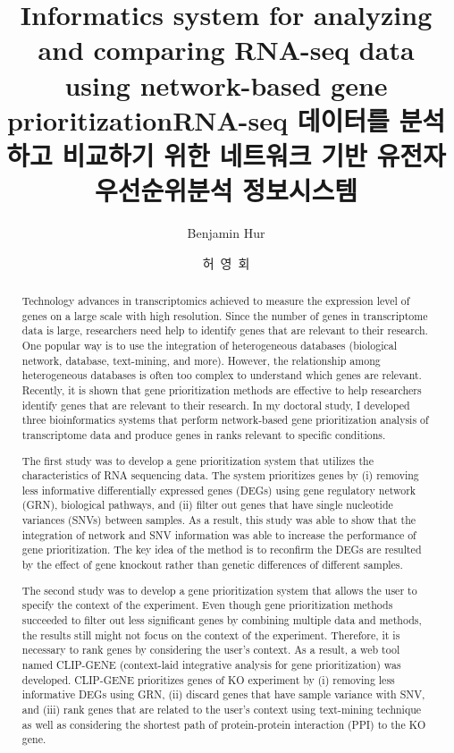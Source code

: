 \documentclass[oneside,phd]{snuthesis}
\title{Informatics system for analyzing and comparing RNA-seq data using network-based gene prioritization}
\title*{RNA-seq 데이터를 분석하고 비교하기 위한 네트워크 기반 유전자우선순위분석 정보시스템}
\author{Benjamin Hur}
\author*{허~영~회} %
\begin{document}
\makefrontcover
\makefrontcover
\makeapproval

\cleardoublepage
{}

\begin{abstract}
\noindent
Technology advances in transcriptomics achieved to measure the expression level of genes on a large scale with high resolution. Since the number of genes in transcriptome data is large, researchers need help to identify genes that are relevant to their research. One popular way is to use the integration of heterogeneous databases (biological network, database, text-mining, and more). However, the relationship among heterogeneous databases is often too complex to understand which genes are relevant. Recently, it is shown that gene prioritization methods are effective to help researchers identify genes that are relevant to their research. In my doctoral study, I developed three bioinformatics systems that perform network-based gene prioritization analysis of transcriptome data and produce genes in ranks relevant to specific conditions.

The first study was to develop a gene prioritization system that utilizes the characteristics of RNA sequencing data. The system prioritizes genes by (i) removing less informative differentially expressed genes (DEGs) using gene regulatory network (GRN), biological pathways, and (ii) filter out genes that have single nucleotide variances (SNVs) between samples. As a result, this study was able to show that the integration of network and SNV information was able to increase the performance of gene prioritization. The key idea of the method is to reconfirm the DEGs are resulted by the effect of gene knockout rather than genetic differences of different samples.

The second study was to develop a gene prioritization system that allows the user to specify the context of the experiment. Even though gene prioritization methods succeeded to filter out less significant genes by combining multiple data and methods, the results still might not focus on the context of the experiment. Therefore, it is necessary to rank genes by considering the user's context. As a result, a web tool named CLIP-GENE (context-laid integrative analysis for gene prioritization) was developed. CLIP-GENE prioritizes genes of KO experiment by (i) removing less informative DEGs using GRN, (ii) discard genes that have sample variance with SNV, and (iii) rank genes that are related to the user's context using text-mining technique as well as considering the shortest path of protein-protein interaction (PPI) to the KO gene.


\end{abstract}
\end{document}
